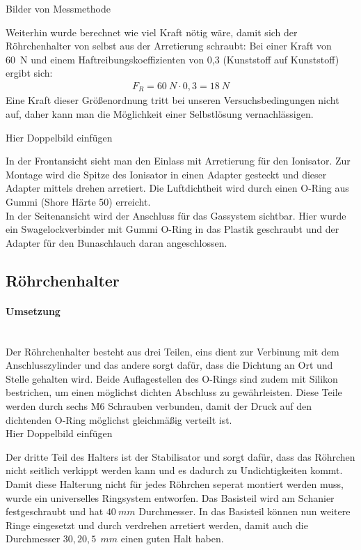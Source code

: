 Bilder von Messmethode

Weiterhin wurde berechnet wie viel Kraft nötig wäre, damit sich der Röhrchenhalter von selbst aus der Arretierung schraubt:
Bei einer Kraft von \SI{60}{N} und einem Haftreibungskoeffizienten von 0,3 (Kunststoff auf Kunststoff) ergibt sich:
\begin{align*}
F_R = \SI{60}{N} \cdot 0,3 = \SI{18}{N}
\end{align*}
Eine Kraft dieser Größenordnung tritt bei unseren Versuchsbedingungen nicht auf, daher kann man die Möglichkeit einer Selbstlösung vernachlässigen.


Hier Doppelbild einfügen

In der Frontansicht sieht man den Einlass mit Arretierung für den Ionisator. Zur Montage wird die Spitze des Ionisator in einen Adapter gesteckt und dieser Adapter mittels drehen arretiert. Die Luftdichtheit wird durch einen O-Ring aus Gummi (Shore Härte 50) erreicht. \\
In der Seitenansicht wird der Anschluss für das Gassystem sichtbar. Hier wurde ein Swagelockverbinder mit Gummi O-Ring in das Plastik geschraubt und der Adapter für den Bunaschlauch daran angeschlossen.


\subsection{Röhrchenhalter}

\paragraph{Umsetzung}

\hfill \\

Der Röhrchenhalter besteht aus drei Teilen, eins dient zur Verbinung mit dem Anschlusszylinder und das andere sorgt dafür, dass die Dichtung an Ort und Stelle gehalten wird. Beide Auflagestellen des O-Rings sind zudem mit Silikon bestrichen, um einen möglichst dichten Abschluss zu gewährleisten.
Diese Teile werden durch sechs M6 Schrauben verbunden, damit der Druck auf den dichtenden O-Ring möglichst gleichmäßig verteilt ist. \\

Hier Doppelbild einfügen


Der dritte Teil des Halters ist der Stabilisator und sorgt dafür, dass das Röhrchen nicht seitlich verkippt werden kann und es dadurch zu Undichtigkeiten kommt. Damit diese Halterung nicht für jedes Röhrchen seperat montiert werden muss, wurde ein universelles Ringsystem entworfen. Das Basisteil wird am Schanier festgeschraubt und hat $\SI{40}{mm}$ Durchmesser. In das Basisteil können nun weitere Ringe eingesetzt und durch verdrehen arretiert werden, damit auch die Durchmesser $30,20,5\SI{}{\ mm}$ einen guten Halt haben.


